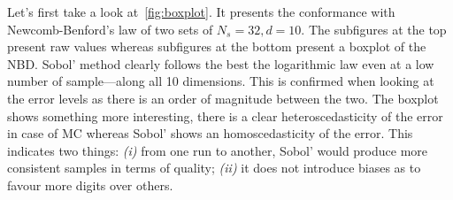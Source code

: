 \documentclass[1p]{elsarticle}
\begin{document}
Let's first take a look at~\cref{fig:boxplot}. It presents the conformance with Newcomb-Benford's law of two sets of $N_s=32, d=10$. The subfigures at the top present raw values whereas subfigures at the bottom present a boxplot of the NBD. Sobol' method clearly follows the best the logarithmic law even at a low number of sample---along all 10 dimensions. This is confirmed when looking at the error levels as there is an order of magnitude between the two. The boxplot shows something more interesting, there is a clear heteroscedasticity of the error in case of MC whereas Sobol' shows an homoscedasticity of the error. This indicates two things: \emph{(i)} from one run to another, Sobol' would produce more consistent samples in terms of quality; \emph{(ii)} it does not introduce biases as to favour more digits over others.
\end{document}
